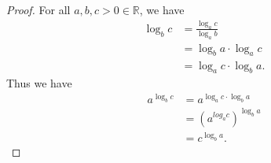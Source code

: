 
\begin{proof}
    For all $a, b, c > 0 \in \mathbb{R}$, we have
    \begin{equation*}
        \begin{split}
            \log_b{c} &= \frac{\log_a{c}}{\log_a{b}} \\
                      &= \log_b{a} \cdot \log_a{c} \\
                      &= \log_a{c} \cdot \log_b{a}.
        \end{split}
    \end{equation*}
    Thus we have
    \begin{equation*}
        \begin{split}
            a^{\log_b{c}} &= a^{\log_a{c} \cdot \log_b{a}} \\
                          &= {(a^{log_a{c}})}^{\log_b{a}} \\
                          &= c^{\log_b{a}}.
        \end{split}
    \end{equation*}
\end{proof}
